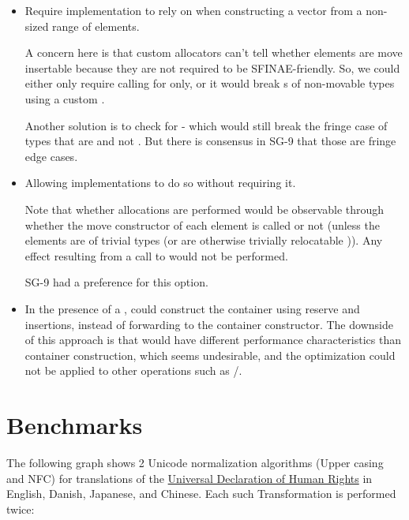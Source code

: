 \documentclass{wg21}
\begin{document}
\begin{itemize}
  \item Require implementation to rely on  when constructing a vector from a non-sized range of  elements.

        A concern here is that custom allocators can't tell whether elements are move insertable because they are not required to be SFINAE-friendly.
        So, we could either only require calling  for  only, or it would break s of non-movable types using a custom .

        Another solution is to check for  - which would still break the fringe case of types that are  and not .
        But there is consensus in SG-9 that those are fringe edge cases.

  \item Allowing implementations to do so without requiring it.

        Note that whether allocations are performed would be observable through whether the move constructor of each element is called or not (unless the elements are of trivial types (or are otherwise trivially relocatable )). Any effect resulting from a call to  would not be performed.

        SG-9 had a preference for this option.

  \item In the presence of a ,  could construct the container using reserve and insertions, instead of forwarding to the container constructor.
        The downside of this approach is that  would have different performance characteristics than container construction, which seems undesirable, and the optimization could not be applied to other operations such as /.
\end{itemize}

\section{Benchmarks}

The following graph shows 2 Unicode normalization algorithms (Upper casing and NFC) for translations of the \href{https://unicode.org/udhr/index.html}{Universal Declaration of Human Rights} in English, Danish, Japanese, and Chinese.
Each such Transformation is performed twice:
\end{document}
